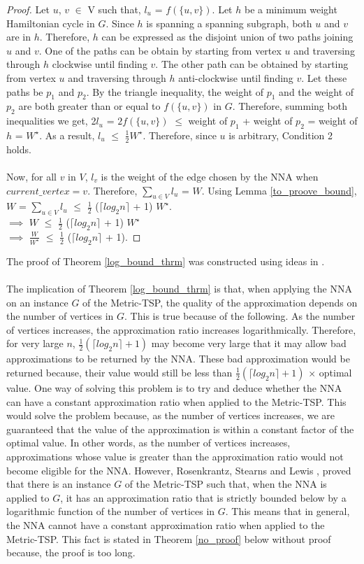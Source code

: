 \documentclass{article}
\begin{document}
\begin{proof}
Let  $u$, $v$ $\in$ V such that, $l_u$ = $f(\{u, v\})$. Let $h$ be a minimum weight Hamiltonian cycle in $G$. Since $h$ is spanning a spanning subgraph, both $u$ and $v$ are in $h$. Therefore, $h$ can be expressed as the disjoint union of two paths joining $u$ and $v$. One of the paths can be obtain by starting from vertex $u$ and traversing through $h$ clockwise until finding $v$. The other path can be obtained by starting from vertex $u$ and traversing through $h$ anti-clockwise until finding $v$. Let these paths be $p_1$ and $p_2$. By the triangle inequality, the weight of $p_1$ and the weight of $p_2$ are both greater than or equal to $f(\{u,v\})$ in $G$. Therefore, summing both inequalities we get, 2$l_u$ = $2f(\{u,v\})$ $\leq$ weight of $p_1$ + weight of $p_2$ = weight of $h$ = $W^\star$. As a result, $l_u$ $\leq$ $\frac{1}{2}W^\star$. Therefore, since $u$ is arbitrary, Condition 2 holds.\\\\Now, for all $v$ in $V$, $l_v$ is the weight of the edge chosen by the NNA when $current\_vertex = v$. Therefore, $\sum_{u \in V} l_u $ =  $W$. Using Lemma \ref{to_proove_bound}, $W$ = $\sum_{u \in V} l_u $ $\leq$ $\frac{1}{2}$ ($\lceil log_2 n \rceil$ + 1) $W^\star$.\\ $\implies$ $W$ $\leq$ $\frac{1}{2}$ ($\lceil log_2 n \rceil$ + 1) $W^\star$\\ $\implies$ $\frac{W}{W^\star}$ $\leq$ $\frac{1}{2}$ ($\lceil log_2 n \rceil$ + 1).
\end{proof}
The proof of Theorem \ref{log_bound_thrm} was constructed using ideas in \cite{Rosenkrantz}.\\\\
The implication of Theorem \ref{log_bound_thrm} is that, when applying the NNA on an instance $G$ of the Metric-TSP, the quality of the approximation depends on the number of vertices in $G$. This is true because of the following. As the number of vertices increases, the approximation ratio increases logarithmically. Therefore, for very large $n$, $\frac{1}{2}(\lceil log_2 n \rceil + 1)$ may become very large that it may allow bad approximations to be returned by the NNA. These bad approximation would be returned because, their value would still be less than $\frac{1}{2}(\lceil log_2 n \rceil + 1)$ $\times$ optimal value. One way of solving this problem is to try and deduce whether the NNA can have a constant approximation ratio when applied to the Metric-TSP. This would solve the problem because, as the number of vertices increases, we are guaranteed that the value of the approximation is within a constant factor of the optimal value. In other words, as the number of vertices increases, approximations whose value is greater than the approximation ratio would not become eligible for the NNA. However, Rosenkrantz, Stearns and Lewis \cite{Rosenkrantz}, proved that there is an instance $G$ of the Metric-TSP such that, when the NNA is applied to $G$, it has an approximation ratio that is strictly bounded below by a logarithmic function of the number of vertices in $G$. This means that in general, the NNA cannot have a constant approximation ratio when applied to the Metric-TSP. This fact is stated in Theorem \ref{no_proof} below without proof because, the proof is too long.
\end{document}
